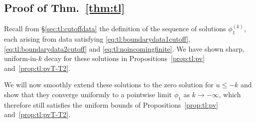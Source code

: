 \documentclass[11pt,english]{article}
\numberwithin{equation}{section}
\theoremstyle{remark}
\theoremstyle{plain}
\theoremstyle{remark}
\renewcommand{\(}{\left(}
\renewcommand{\)}{\right)}
\begin{document}
\subsection{Proof of Thm.~\ref{thm:tl}}\label{sec:tl:limit}
Recall from \S\ref{sec:tl:cutoffdata} the definition of the sequence of solutions $\phi_1^{(k)}$, each arising from  data satisfying \eqref{eq:tl:boundarydata1cutoff}, \eqref{eq:tl:boundarydata2cutoff} and \eqref{eq:tl:noincomingfinite}. We have shown sharp, uniform-in-$k$ decay for these solutions in Propositions~\ref{prop:tl:pv} and~\ref{prop:tl:pvT-T2}. 

We will now smoothly extend these solutions to the zero solution for $u\leq -k$ and show that they  converge uniformly to a pointwise limit $\phi_1$ as $k\to -\infty$, which therefore still satisfies the uniform bounds of Propositions~\ref{prop:tl:pv} and~\ref{prop:tl:pvT-T2}.
\end{document}
